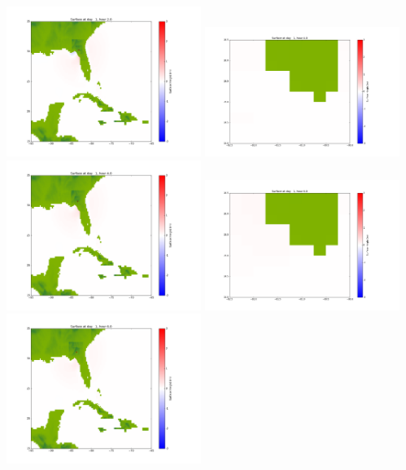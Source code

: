 \documentclass[11pt]{article}
\begin{document}
\includegraphics[width=0.475\textwidth]{frame0037fig1002.png}
\vskip 10pt 
\includegraphics[width=0.475\textwidth]{frame0038fig1001.png}
\includegraphics[width=0.475\textwidth]{frame0038fig1002.png}
\vskip 10pt 
\includegraphics[width=0.475\textwidth]{frame0039fig1001.png}
\includegraphics[width=0.475\textwidth]{frame0039fig1002.png}
\end{document}
